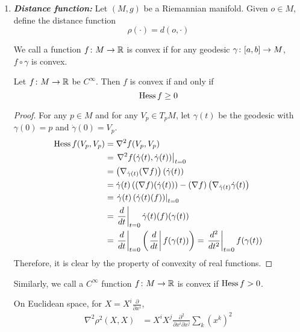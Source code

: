 \begin{enumerate}[label=\arabic{*}.]
	\item \emph{\textbf{Distance function:}}  Let $(M,g)$ be a Riemannian manifold. Given $o \in M$, define the distance function
	\begin{equation*}
		\rho(\cdot) = d(o,\cdot)
	\end{equation*}
	\begin{defn}
		We call a function $f \colon M \rightarrow \mathbb{R}$ is convex if for any geodesic $\gamma \colon [a,b] \rightarrow M$, $f\circ \gamma$ is convex.
	\end{defn}
	\begin{prop}
		Let $f \colon M \rightarrow \mathbb{R}$ be $C^\infty$. Then $f$ is convex if and only if
		\begin{equation*}
			\operatorname{Hess}f \geq 0
		\end{equation*}
	\end{prop}
	\begin{proof}
		For any $p \in M$ and for any $V_p \in T_pM$, let $\gamma(t)$ be the geodesic with $\gamma(0) = p$ and $\dot{\gamma}(0) = V_p$.
		\begin{equation*}
			\begin{aligned}
				\operatorname{Hess}f(V_p,V_p) &= \nabla^2f(V_p,V_p) \\
				&= \left.\nabla^2f(\dot{\gamma}(t),\dot{\gamma}(t))\right\lvert_{t=0} \\
				&= \left(\nabla_{\dot{\gamma}(t)}(\nabla f)\right)(\dot{\gamma}(t)) \\
				&=\dot{\gamma}(t)\left((\nabla f)(\dot{\gamma}(t))\right) - \left(\nabla f\right)\left(\nabla_{\dot{\gamma}(t)}\dot{\gamma}(t)\right) \\
				&= \left.\dot{\gamma}(t)\left(\dot{\gamma}(t)(f)\right)\right\lvert_{t=0} \\
				&= \left.\frac{d}{dt}\right\lvert_{t=0}\dot{\gamma}(t)(f)(\gamma(t)) \\
				&= \left.\frac{d}{dt}\right\lvert_{t=0} \left(\left.\frac{d}{dt}\right\lvert f(\gamma(t))\right) = \left.\frac{d^2}{dt^2}\right\lvert_{t=0}f(\gamma(t))
			\end{aligned}
		\end{equation*}
		Therefore, it is clear by the property of convexity of real functions.
	\end{proof}
	Similarly, we call a $C^\infty$ function $f \colon M \rightarrow \mathbb{R}$ is convex if $\operatorname{Hess}f > 0$.
	\begin{exam}
		On Euclidean space, for $X = X^i \frac{\partial}{\partial x^i}$,
		\begin{equation*}
			\begin{aligned}
				\nabla^2 \rho^2(X,X) &= X^iX^j \frac{\partial^2}{\partial x^i \partial x^j}\sum_k(x^k)^2 \\

\end{aligned}
\end{equation*}
\end{exam}
\end{enumerate}
